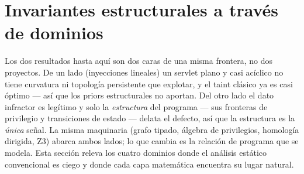 \documentclass[11pt]{article}
\begin{document}
\section{Invariantes estructurales a través de dominios}
Los dos resultados hasta aquí son dos caras de una misma frontera, no dos
proyectos. De un lado (inyecciones lineales) un servlet plano y casi acíclico no
tiene curvatura ni topología persistente que explotar, y el taint clásico ya es
casi óptimo --- así que los priors estructurales no aportan. Del otro lado el
dato infractor es legítimo y solo la \emph{estructura} del programa --- sus
fronteras de privilegio y transiciones de estado --- delata el defecto, así que
la estructura es la \emph{única} señal. La misma maquinaria (grafo tipado,
álgebra de privilegios, homología dirigida, Z3) abarca ambos lados; lo que cambia
es la relación de programa que se modela. Esta sección releva los cuatro dominios
donde el análisis estático convencional es ciego y donde cada capa matemática
encuentra su lugar natural.
\end{document}
